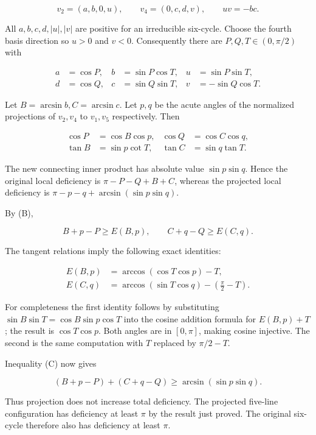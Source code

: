 \documentclass[11pt,a4paper]{article}
\begin{document}
\[
v_2=(a,b,0,u),\qquad v_4=(0,c,d,v),\qquad uv=-bc.
\]

All \(a,b,c,d,|u|,|v|\) are positive for an irreducible six-cycle. Choose the fourth basis direction so \(u>0\) and \(v<0\). Consequently there are \(P,Q,T\in(0,\pi/2)\) with

\[
\begin{aligned}a&=\cos P,&b&=\sin P\cos T,&u&=\sin P\sin T,\\d&=\cos Q,&c&=\sin Q\sin T,&v&=-\sin Q\cos T.\end{aligned}
\]

Let \(B=\arcsin b,C=\arcsin c\). Let \(p,q\) be the acute angles of the normalized projections of \(v_2,v_4\) to \(v_1,v_5\) respectively. Then

\[
\begin{aligned}\cos P&=\cos B\cos p,&\cos Q&=\cos C\cos q,\\\tan B&=\sin p\cot T,&\tan C&=\sin q\tan T.\end{aligned}
\]

The new connecting inner product has absolute value \(\sin p\sin q\). Hence the original local deficiency is \(\pi-P-Q+B+C\), whereas the projected local deficiency is \(\pi-p-q+\arcsin(\sin p\sin q)\).

By (B),

\[
B+p-P\ge E(B,p),\qquad C+q-Q\ge E(C,q).
\]

The tangent relations imply the following exact identities:

\[
\begin{aligned}E(B,p)&=\arccos(\cos T\cos p)-T,\\E(C,q)&=\arccos(\sin T\cos q)-\left(\frac{\pi}{2}-T\right).\end{aligned}
\]

For completeness the first identity follows by substituting \(\sin B\sin T=\cos B\sin p\cos T\) into the cosine addition formula for \(E(B,p)+T\); the result is \(\cos T\cos p\). Both angles are in \([0,\pi]\), making cosine injective. The second is the same computation with \(T\) replaced by \(\pi/2-T\).

Inequality (C) now gives

\[
(B+p-P)+(C+q-Q)\ge\arcsin(\sin p\sin q).
\]

Thus projection does not increase total deficiency. The projected five-line configuration has deficiency at least \(\pi\) by the result just proved. The original six-cycle therefore also has deficiency at least \(\pi\).
\end{document}
